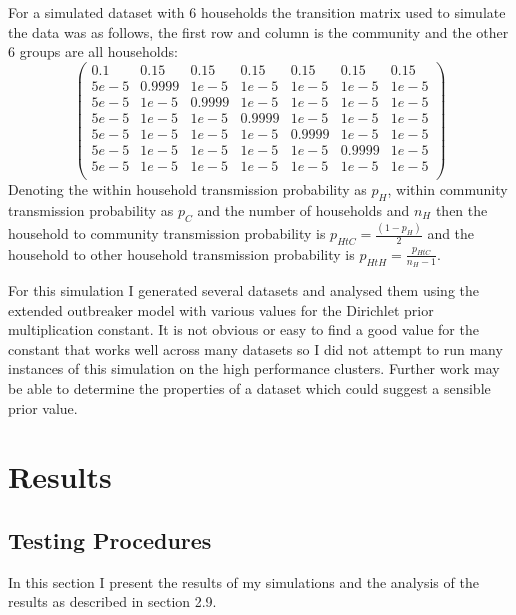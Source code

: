 \documentclass[11pt,a4paper]{report}
\begin{document}
For a simulated dataset with 6 households the transition matrix used to simulate the data was as follows, the first row and column is the community and the other 6 groups are all households:
\[\begin{pmatrix}
0.1 & 0.15 & 0.15 & 0.15 & 0.15 & 0.15 & 0.15 \\
5e-5 & 0.9999 & 1e-5 & 1e-5 & 1e-5 & 1e-5 & 1e-5 \\
5e-5 & 1e-5 & 0.9999 & 1e-5 & 1e-5 & 1e-5 & 1e-5\\
5e-5 & 1e-5 & 1e-5 & 0.9999 & 1e-5 & 1e-5 & 1e-5\\
5e-5 & 1e-5 & 1e-5 & 1e-5 & 0.9999 & 1e-5 & 1e-5\\
5e-5 & 1e-5 & 1e-5 & 1e-5 & 1e-5 & 0.9999 & 1e-5\\
5e-5 & 1e-5 & 1e-5 & 1e-5 & 1e-5 & 1e-5 & 1e-5\\
\end{pmatrix}\]
Denoting the within household transmission probability as $p_{H}$, within community transmission probability as $p_{C}$ and the number of households and $n_{H}$ then the household to community transmission probability is $p_{HtC} = \frac{(1-p_{H})}{2}$ and the household to other household transmission probability is $p_{HtH} = \frac{p_{HtC}}{n_{H} - 1}$.

For this simulation I generated several datasets and analysed them using the extended outbreaker model with various values for the Dirichlet prior multiplication constant. It is not obvious or easy to find a good value for the constant that works well across many datasets so I did not attempt to run many instances of this simulation on the high performance clusters. Further work may be able to determine the properties of a dataset which could suggest a sensible prior value.



\chapter{Results}
\section{Testing Procedures}
In this section I present the results of my simulations and the analysis of the results as described in section 2.9.
\end{document}
